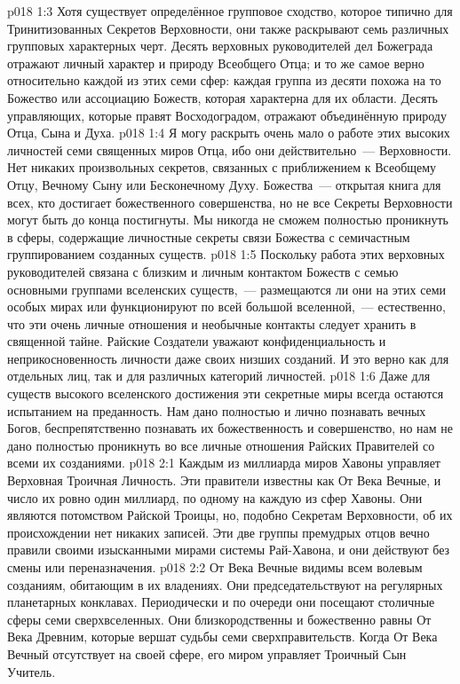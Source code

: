 \vs p018 1:3 Хотя существует определённое групповое сходство, которое типично для Тринитизованных Секретов Верховности, они также раскрывают семь различных групповых характерных черт. Десять верховных руководителей дел Божеграда отражают личный характер и природу Всеобщего Отца; и то же самое верно относительно каждой из этих семи сфер: каждая группа из десяти похожа на то Божество или ассоциацию Божеств, которая характерна для их области. Десять управляющих, которые правят Восходоградом, отражают объединённую природу Отца, Сына и Духа.
\vs p018 1:4 \pc Я могу раскрыть очень мало о работе этих высоких личностей семи священных миров Отца, ибо они действительно~---  Верховности. Нет никаких произвольных секретов, связанных с приближением к Всеобщему Отцу, Вечному Сыну или Бесконечному Духу. Божества~--- открытая книга для всех, кто достигает божественного совершенства, но не все Секреты Верховности могут быть до конца постигнуты. Мы никогда не сможем полностью проникнуть в сферы, содержащие личностные секреты связи Божества с семичастным группированием созданных существ.
\vs p018 1:5 Поскольку работа этих верховных руководителей связана с близким и личным контактом Божеств с семью основными группами вселенских существ,~--- размещаются ли они на этих семи особых мирах или функционируют по всей большой вселенной,~--- естественно, что эти очень личные отношения и необычные контакты следует хранить в священной тайне. Райские Создатели уважают конфиденциальность и неприкосновенность личности даже своих низших созданий. И это верно как для отдельных лиц, так и для различных категорий личностей.
\vs p018 1:6 Даже для существ высокого вселенского достижения эти секретные миры всегда остаются испытанием на преданность. Нам дано полностью и лично познавать вечных Богов, беспрепятственно познавать их божественность и совершенство, но нам не дано полностью проникнуть во все личные отношения Райских Правителей со всеми их созданиями.
\vs p018 2:1 Каждым из миллиарда миров Хавоны управляет Верховная Троичная Личность. Эти правители известны как От Века Вечные, и число их ровно один миллиард, по одному на каждую из сфер Хавоны. Они являются потомством Райской Троицы, но, подобно Секретам Верховности, об их происхождении нет никаких записей. Эти две группы премудрых отцов вечно правили своими изысканными мирами системы Рай\hyp{}Хавона, и они действуют без смены или переназначения.
\vs p018 2:2 От Века Вечные видимы всем волевым созданиям, обитающим в их владениях. Они председательствуют на регулярных планетарных конклавах. Периодически и по очереди они посещают столичные сферы семи сверхвселенных. Они близкородственны и божественно равны От Века Древним, которые вершат судьбы семи сверхправительств. Когда От Века Вечный отсутствует на своей сфере, его миром управляет Троичный Сын Учитель.
